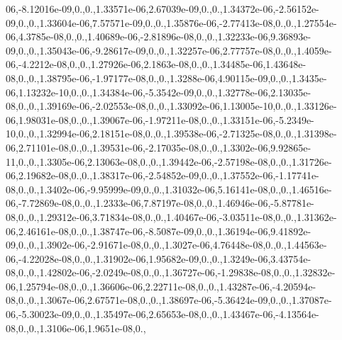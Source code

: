 {\/06,-\/8.\-12016e-\/09,0.,0.,1.\-33571e-\/06,2.\-67039e-\/09,0.,0.,1.\-34372e-\/06,-\/2.\-56152e-\/09,0.,0.,1.\-33604e-\/06,7.\-57571e-\/09,0.,0.,1.\-35876e-\/06,-\/2.\-77413e-\/08,0.,0.,1.\-27554e-\/06,4.\-3785e-\/08,0.,0.,1.\-40689e-\/06,-\/2.\-81896e-\/08,0.,0.,1.\-32233e-\/06,9.\-36893e-\/09,0.,0.,1.\-35043e-\/06,-\/9.\-28617e-\/09,0.,0.,1.\-32257e-\/06,2.\-77757e-\/08,0.,0.,1.\-4059e-\/06,-\/4.\-2212e-\/08,0.,0.,1.\-27926e-\/06,2.\-1863e-\/08,0.,0.,1.\-34485e-\/06,1.\-43648e-\/08,0.,0.,1.\-38795e-\/06,-\/1.\-97177e-\/08,0.,0.,1.\-3288e-\/06,4.\-90115e-\/09,0.,0.,1.\-3435e-\/06,1.\-13232e-\/10,0.,0.,1.\-34384e-\/06,-\/5.\-3542e-\/09,0.,0.,1.\-32778e-\/06,2.\-13035e-\/08,0.,0.,1.\-39169e-\/06,-\/2.\-02553e-\/08,0.,0.,1.\-33092e-\/06,1.\-13005e-\/10,0.,0.,1.\-33126e-\/06,1.\-98031e-\/08,0.,0.,1.\-39067e-\/06,-\/1.\-97211e-\/08,0.,0.,1.\-33151e-\/06,-\/5.\-2349e-\/10,0.,0.,1.\-32994e-\/06,2.\-18151e-\/08,0.,0.,1.\-39538e-\/06,-\/2.\-71325e-\/08,0.,0.,1.\-31398e-\/06,2.\-71101e-\/08,0.,0.,1.\-39531e-\/06,-\/2.\-17035e-\/08,0.,0.,1.\-3302e-\/06,9.\-92865e-\/11,0.,0.,1.\-3305e-\/06,2.\-13063e-\/08,0.,0.,1.\-39442e-\/06,-\/2.\-57198e-\/08,0.,0.,1.\-31726e-\/06,2.\-19682e-\/08,0.,0.,1.\-38317e-\/06,-\/2.\-54852e-\/09,0.,0.,1.\-37552e-\/06,-\/1.\-17741e-\/08,0.,0.,1.\-3402e-\/06,-\/9.\-95999e-\/09,0.,0.,1.\-31032e-\/06,5.\-16141e-\/08,0.,0.,1.\-46516e-\/06,-\/7.\-72869e-\/08,0.,0.,1.\-2333e-\/06,7.\-87197e-\/08,0.,0.,1.\-46946e-\/06,-\/5.\-87781e-\/08,0.,0.,1.\-29312e-\/06,3.\-71834e-\/08,0.,0.,1.\-40467e-\/06,-\/3.\-03511e-\/08,0.,0.,1.\-31362e-\/06,2.\-46161e-\/08,0.,0.,1.\-38747e-\/06,-\/8.\-5087e-\/09,0.,0.,1.\-36194e-\/06,9.\-41892e-\/09,0.,0.,1.\-3902e-\/06,-\/2.\-91671e-\/08,0.,0.,1.\-3027e-\/06,4.\-76448e-\/08,0.,0.,1.\-44563e-\/06,-\/4.\-22028e-\/08,0.,0.,1.\-31902e-\/06,1.\-95682e-\/09,0.,0.,1.\-3249e-\/06,3.\-43754e-\/08,0.,0.,1.\-42802e-\/06,-\/2.\-0249e-\/08,0.,0.,1.\-36727e-\/06,-\/1.\-29838e-\/08,0.,0.,1.\-32832e-\/06,1.\-25794e-\/08,0.,0.,1.\-36606e-\/06,2.\-22711e-\/08,0.,0.,1.\-43287e-\/06,-\/4.\-20594e-\/08,0.,0.,1.\-3067e-\/06,2.\-67571e-\/08,0.,0.,1.\-38697e-\/06,-\/5.\-36424e-\/09,0.,0.,1.\-37087e-\/06,-\/5.\-30023e-\/09,0.,0.,1.\-35497e-\/06,2.\-65653e-\/08,0.,0.,1.\-43467e-\/06,-\/4.\-13564e-\/08,0.,0.,1.\-3106e-\/06,1.\-9651e-\/08,0.,}
